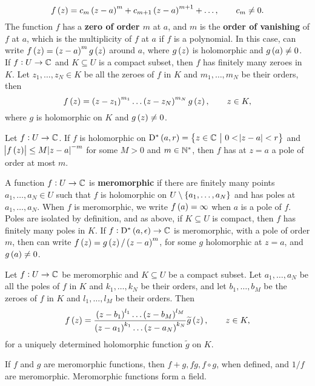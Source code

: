$$ f\br{z} = c_m\br{z - a}^m + c_{m + 1}\br{z - a}^{m + 1} + \dots, \qquad c_m \ne 0. $$
The function $ f $ has a \textbf{zero of order $ m $} at $ a $, and $ m $ is the \textbf{order of vanishing} of $ f $ at $ a $, which is the multiplicity of $ f $ at $ a $ if $ f $ is a polynomial. In this case, can write $ f\br{z} = \br{z - a}^mg\br{z} $ around $ a $, where $ g\br{z} $ is holomorphic and $ g\br{a} \ne 0 $. If $ f : U \to \mathbb{C} $ and $ K \subseteq U $ is a compact subset, then $ f $ has finitely many zeroes in $ K $. Let $ z_1, \dots, z_N \in K $ be all the zeroes of $ f $ in $ K $ and $ m_1, \dots, m_N $ be their orders, then
$$ f\br{z} = \br{z - z_1}^{m_1} \dots \br{z - z_N}^{m_N}g\br{z}, \qquad z \in K, $$
where $ g $ is holomorphic on $ K $ and $ g\br{z} \ne 0 $.

\begin{proposition}
Let $ f : U \to \mathbb{C} $. If $ f $ is holomorphic on $ \D^*\br{a, r} = \cbr{z \in \CC \st 0 < \abs{z - a} < r} $ and $ \abs{f\br{z}} \le M\abs{z - a}^{-m} $ for some $ M > 0 $ and $ m \in \mathbb{N}^* $, then $ f $ has at $ z = a $ a pole of order at most $ m $.
\end{proposition}

A function $ f : U \to \mathbb{C} $ is \textbf{meromorphic} if there are finitely many points $ a_1, \dots, a_N \in U $ such that $ f $ is holomorphic on $ U \setminus \cbr{a_1, \dots, a_N} $ and has poles at $ a_1, \dots, a_N $. When $ f $ is meromorphic, we write $ f\br{a} = \infty $ when $ a $ is a pole of $ f $. Poles are isolated by definition, and as above, if $ K \subseteq U $ is compact, then $ f $ has finitely many poles in $ K $. If $ f : \D^*\br{a, \epsilon} \to \CC $ is meromorphic, with a pole of order $ m $, then can write $ f\br{z} = g\br{z} / \br{z - a}^m $, for some $ g $ holomorphic at $ z = a $, and $ g\br{a} \ne 0 $.

\begin{proposition}
Let $ f : U \to \mathbb{C} $ be meromorphic and $ K \subseteq U $ be a compact subset. Let $ a_1, \dots, a_N $ be all the poles of $ f $ in $ K $ and $ k_1, \dots, k_N $ be their orders, and let $ b_1, \dots, b_M $ be the zeroes of $ f $ in $ K $ and $ l_1, \dots, l_M $ be their orders. Then
$$ f\br{z} = \dfrac{\br{z - b_1}^{l_1} \dots \br{z - b_M}^{l_M}}{\br{z - a_1}^{k_1} \dots \br{z - a_N}^{k_N}}\widetilde{g}\br{z}, \qquad z \in K, $$
for a uniquely determined holomorphic function $ \widetilde{g} $ on $ K $.
\end{proposition}

If $ f $ and $ g $ are meromorphic functions, then $ f + g, fg, f \circ g $, when defined, and $ 1 / f $ are meromorphic. Meromorphic functions form a field.

